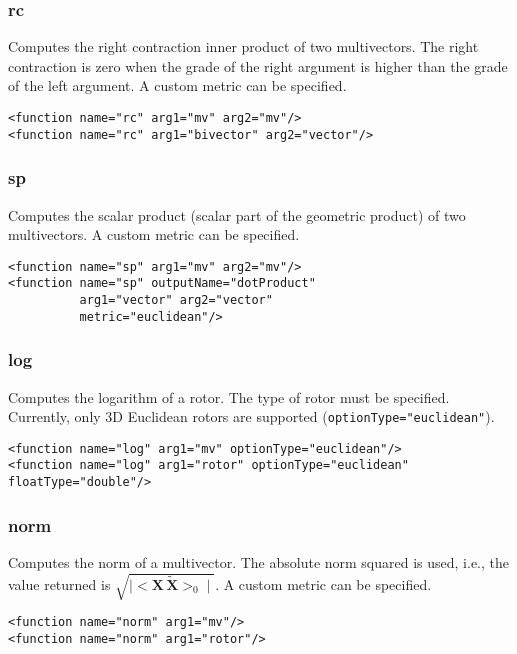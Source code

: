 \documentclass[10pt, a4paper]{article}
\newcommand{\gav}[1]{\ensuremath{\mathbf{#1}}}
\newcommand{\gp}{\,}
\newcommand{\rev}[1]{\widetilde{#1}}
\begin{document}
\subsubsection*{rc}

Computes the right contraction inner product of two multivectors.
The right contraction is zero when the grade of the right argument
is higher than the grade of the left argument.
A custom metric can be specified.
\begin{verbatim}
<function name="rc" arg1="mv" arg2="mv"/>
<function name="rc" arg1="bivector" arg2="vector"/>
\end{verbatim}

\subsubsection*{sp}

Computes the scalar product (scalar part of the geometric product) of two multivectors.
A custom metric can be specified.
\begin{verbatim}
<function name="sp" arg1="mv" arg2="mv"/>
<function name="sp" outputName="dotProduct" 
          arg1="vector" arg2="vector"
          metric="euclidean"/>
\end{verbatim}

\subsubsection*{log}



Computes the logarithm of a rotor. The type of rotor must be specified.
Currently, only 3D Euclidean rotors are supported ({\tt optionType="euclidean"}).
\begin{verbatim}
<function name="log" arg1="mv" optionType="euclidean"/>
<function name="log" arg1="rotor" optionType="euclidean" floatType="double"/>
\end{verbatim}

\subsubsection*{norm}

Computes the norm of a multivector.
The absolute norm squared is used, i.e., the value returned is $\sqrt{ \mid < \gav{X} \gp \rev{\gav{X}} >_{0} \mid}$.
A custom metric can be specified.
\begin{verbatim}
<function name="norm" arg1="mv"/>
<function name="norm" arg1="rotor"/>
\end{verbatim}
\end{document}
